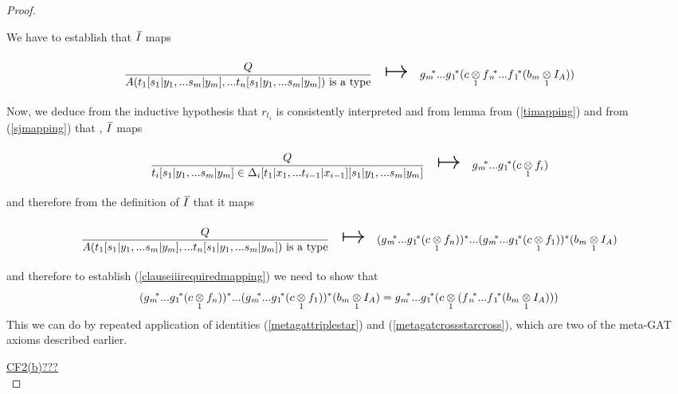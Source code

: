 \begin{proof}
\begin{newtt}
We have to establish that $\Ibar$ maps
\begin{equation}
\label{clauseiiirequiredmapping}
\begin{array}{c c c}
\forceSOURCEwidth & & \forceTARGETwidth \\ [-0.1cm]
\gatdisplayrule{Q}{\isT{A(t_1[\ssubbedfory],...t_n[\ssubbedfory])}}   & \Imapsto & \gmvectorstar (\crossx{c}{\fnvectorstar(\crossx{b_m}{I_A}{1})}{1}) \\ [0.4cm]
\end{array}
\end{equation}
Now, we deduce from  the inductive hypothesis that $r_{t_i}$ is consistently interpreted and 
from lemma  from (\ref{timapping}) and from (\ref{sjmapping}) that \foreachi, $\Ibar$ maps
\begin{equation}
\begin{array}{c c c}
\forceSOURCEwidth & & \forceTARGETwidth \\ [-0.1cm]
\gatdisplayrule{Q}{\ofT{t_i[\ssubbedfory]}{\Delta_i[t_1 | x_1,...t_{i-1}|x_{i-1}][\ssubbedfory]}}  & \Imapsto & \gmvectorstar (\crossx{c}{f_i}{1}) \\ [0.4cm]
\end{array}
\end{equation}
and therefore from the definition of $\Ibar$ that it maps
\begin{equation*}
\begin{array}{c c c}
\forceSOURCEwidth & & \forceTARGETwidth \\ [-0.1cm]
\gatdisplayrule{Q}{\isT{A(t_1[\ssubbedfory],...t_n[\ssubbedfory])}}  & \Imapsto & \clausethreelhs \\ [0.4cm]
\end{array}
\end{equation*}
and therefore to establish (\ref{clauseiiirequiredmapping}) we need to show that
\begin{equation*}
(g{_m}\kern-.25em^*...g{_1}\kern-.15em^* (c \underset{1}{\otimes} f_n))^* ... (g{_m}\kern-.25em^*...g{_1}\kern-.15em^* (c \underset{1}{\otimes} f_1)) ^* (b_m \underset{1}{\otimes} I_A) = g{_m}\kern-.25em^*...g{_1}\kern-.15em^* ( c \underset{1}{\otimes} (f{_n}\kern-.2em^*...f{_1}\kern-.15em^*(b_m \underset{1}{\otimes} I_A)) )										
\end{equation*}
This we can do by repeated application of identities (\ref{metagattriplestar})
and (\ref{metagatcrossstarcross}), which are two of the meta-GAT axioms described earlier.\\
\end{newtt}

\underline{CF2(b)???} \\


\end{proof}
